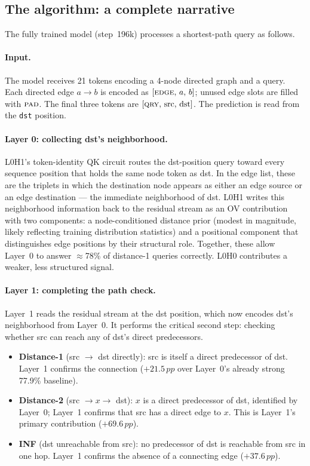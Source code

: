 \documentclass[11pt, a4paper]{article}
\newcommand{\PAD}{\textsc{pad}}
\newcommand{\EDGE}{\textsc{edge}}
\newcommand{\QRY}{\textsc{qry}}
\newcommand{\pp}{\,pp}  %
\begin{document}
\subsection{The algorithm: a complete narrative}

The fully trained model (step~196k) processes a shortest-path query as
follows.

\paragraph{Input.}
The model receives 21 tokens encoding a 4-node directed graph and a
query.  Each directed edge $a \to b$ is encoded as
$[\EDGE,\, a,\, b]$; unused edge slots are filled with $\PAD$.  The
final three tokens are $[\QRY,\, \mathrm{src},\, \mathrm{dst}]$.  The
prediction is read from the \texttt{dst} position.

\paragraph{Layer 0: collecting dst's neighborhood.}
L0H1's token-identity QK circuit routes the dst-position query toward
every sequence position that holds the same node token as dst.  In the
edge list, these are the triplets in which the destination node appears
as either an edge source or an edge destination --- the immediate
neighborhood of dst.  L0H1 writes this neighborhood information back
to the residual stream as an OV contribution with two components: a
node-conditioned distance prior (modest in magnitude, likely reflecting
training distribution statistics) and a positional component that
distinguishes edge positions by their structural role.  Together, these
allow Layer~0 to answer $\approx$78\% of distance-1 queries correctly.
L0H0 contributes a weaker, less structured signal.

\paragraph{Layer 1: completing the path check.}
Layer~1 reads the residual stream at the dst position, which now
encodes dst's neighborhood from Layer~0.  It performs the critical
second step: checking whether src can reach any of dst's direct
predecessors.

\begin{itemize}[noitemsep]
  \item \textbf{Distance-1} (src $\to$ dst directly): src is itself a
    direct predecessor of dst.  Layer~1 confirms the connection
    ($+21.5\pp$ over Layer~0's already strong 77.9\% baseline).

  \item \textbf{Distance-2} (src $\to x \to$ dst): $x$ is a direct
    predecessor of dst, identified by Layer~0; Layer~1 confirms that
    src has a direct edge to $x$.  This is Layer~1's primary
    contribution ($+69.6\pp$).

  \item \textbf{INF} (dst unreachable from src): no predecessor of dst
    is reachable from src in one hop.  Layer~1 confirms the absence of
    a connecting edge ($+37.6\pp$).
\end{itemize}
\end{document}
